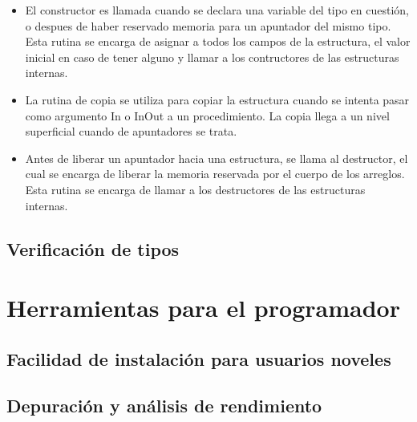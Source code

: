 \begin{itemize}

  \item El constructor es llamada cuando se declara una variable del tipo en cuestión, o despues de haber reservado memoria para un apuntador del mismo tipo.
  Esta rutina se encarga de asignar a todos los campos de la estructura, el
  valor inicial en caso de tener alguno y llamar a los contructores de las estructuras internas.

  \item La rutina de copia se utiliza para copiar la estructura cuando se
  intenta pasar como argumento In o InOut a un procedimiento. La copia llega a
  un nivel superficial cuando de apuntadores se trata.

  \item Antes de liberar un apuntador hacia una estructura, se llama al
  destructor, el cual se encarga de liberar la memoria reservada por el cuerpo
  de los arreglos. Esta rutina se encarga de llamar a los destructores de las estructuras internas.

\end{itemize}


\subsection{Verificación de tipos}
\blindtext[1]

\section{Herramientas para el programador}
\subsection{Facilidad de instalación para usuarios noveles}
\blindtext[1]

\subsection{Depuración y análisis de rendimiento}
\blindtext[1]

